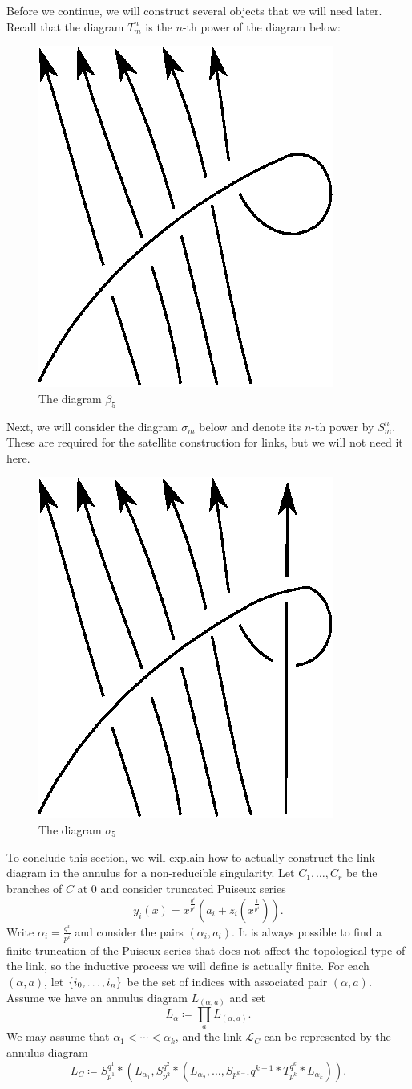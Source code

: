 \documentclass[leqno, openany]{memoir}
\theoremstyle{definition}
\theoremstyle{remark}
\theoremstyle{plain}
\theoremstyle{definition}
\theoremstyle{remark}
\newcommand{\mc}[1]{\mathcal{#1}}
\newcommand{\1}{\mathbf{1}}
\newcommand{\2}{\mathbf{2}}
\newcommand{\3}{\mathbf{3}}
\begin{document}
Before we continue, we will construct several objects that we will need later. Recall that the diagram $T_m^n$ is the $n$-th power of the diagram below: 
\begin{figure}[H]
    \centering
    \includegraphics[width=0.2\linewidth]{torusbraid.eps}
    \caption{The diagram $\beta_5$}%
    \label{fig:torusbraid}
\end{figure}
Next, we will consider the diagram $\sigma_m$ below and denote its $n$-th power by $S_m^n$. These are required for the satellite construction for links, but we will not need it here.
\begin{figure}[H]
    \centering
    \includegraphics[width=0.2\linewidth]{splicebraid.eps}
    \caption{The diagram $\sigma_5$}%
    \label{fig:splicebraid}
\end{figure}

To conclude this section, we will explain how to actually construct the link diagram in the annulus for a non-reducible singularity. Let $C_1, \ldots, C_r$ be the branches of $C$ at $0$ and consider truncated Puiseux series
\[ y_i(x) = x^{\frac{q^i}{p^i}} (a_i + z_i(x^{\frac{1}{p^i}})). \]
Write $\alpha_i = \frac{q^i}{p^i}$ and consider the pairs $(\alpha_i, a_i)$. It is always possible to find a finite truncation of the Puiseux series that does not affect the topological type of the link, so the inductive process we will define is actually finite. For each $(\alpha, a)$, let $\qty{i_0, \ldots, i_n}$ be the set of indices with associated pair $(\alpha, a)$. Assume we have an annulus diagram $L_{(\alpha, a)}$ and set
\[ L_{\alpha} \coloneqq \prod_a L_{(\alpha, a)}. \]
We may assume that $\alpha_1 < \cdots < \alpha_k$, and the link $\mc{L}_C$ can be represented by the annulus diagram
\[ L_C \coloneqq S_{p^1}^{q^1} * (L_{\alpha_1}, S_{p^2}^{q^2} * (L_{\alpha_2}, \ldots, S_{p^{k-1}}{q^{k-1}} * T_{p^k}^{q^k} * L_{\alpha_k})). \]
\end{document}
